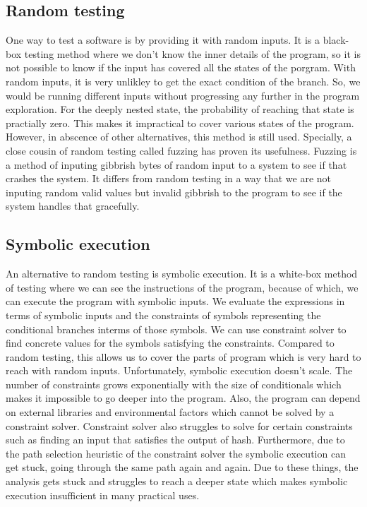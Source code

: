 \documentclass[	runningheads,
				a4paper]{llncs}
\begin{document}
\subsection{Random testing}
One way to test a software is by providing it with random inputs. It is a black-box testing method where we don't know the inner details of the program, so it is not possible to know if the input has covered all the states of the porgram. With random inputs, it is very unlikley to get the exact condition of the branch. So, we would be running different inputs without progressing any further in the program exploration. For the deeply nested state, the probability of reaching that state is practially zero. This makes it impractical to cover various states of the program. However, in abscence of other alternatives, this method is still used. Specially, a close cousin of random testing called fuzzing \cite{miller1990empirical} has proven its usefulness. Fuzzing is a method of inputing gibbrish bytes of random input to a system to see if that crashes the system. It differs from random testing in a way that we are not inputing random valid values but invalid gibbrish to the program to see if the system handles that gracefully.

\subsection{Symbolic execution}
An alternative to random testing is symbolic execution. It is a white-box method of testing where we can see the instructions of the program, because of which, we can execute the program with symbolic inputs. We evaluate the expressions in terms of symbolic inputs and the constraints of symbols representing the conditional branches interms of those symbols. We can use constraint solver to find concrete values for the symbols satisfying the constraints. Compared to random testing, this allows us to cover the parts of program which is very hard to reach with random inputs. Unfortunately, symbolic execution doesn't scale. The number of constraints grows exponentially with the size of conditionals which makes it impossible to go deeper into the program. Also, the program can depend on external libraries and environmental factors which cannot be solved by a constraint solver. Constraint solver also struggles to solve for certain constraints such as finding an input that satisfies the output of hash. Furthermore, due to the path selection heuristic of the constraint solver the symbolic execution can get stuck, going through the same path again and again. Due to these things, the analysis gets stuck and struggles to reach a deeper state which makes symbolic execution insufficient in many practical uses.
\end{document}
